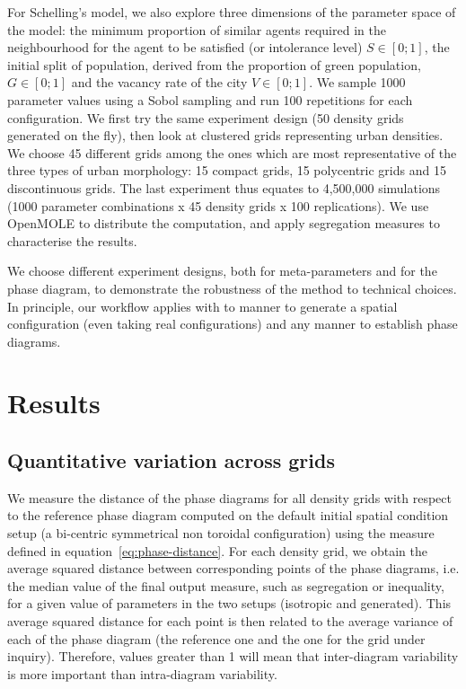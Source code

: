 \documentclass[3p,times,procedia]{elsarticle}
\begin{document}
For Schelling's model, we also explore three dimensions of the parameter space of the model: the minimum proportion of similar agents required in the neighbourhood for the agent to be satisfied (or intolerance level) $S\in \left[0;1\right]$, the initial split of population, derived from the proportion of green population, $G\in \left[0;1\right]$ and the vacancy rate of the city $V\in \left[0;1\right]$. We sample 1000 parameter values using a Sobol sampling and run 100 repetitions for each configuration. We first try the same experiment design (50 density grids generated on the fly), then look at clustered grids representing urban densities. We choose 45 different grids among the ones which are most representative of the three types of urban morphology: 15 compact grids, 15 polycentric grids and 15 discontinuous grids. The last experiment thus equates to 4,500,000 simulations (1000 parameter combinations x 45 density grids x 100 replications). We use OpenMOLE to distribute the computation, and apply segregation measures to characterise the results.



We choose different experiment designs, both for meta-parameters and for the phase diagram, to demonstrate the robustness of the method to technical choices. In principle, our workflow applies with to manner to generate a spatial configuration (even taking real configurations) and any manner to establish phase diagrams.




\section{Results}


\subsection{Quantitative variation across grids}

We measure the distance of the phase diagrams for all density grids with respect to the reference phase diagram computed on the default initial spatial condition setup (a bi-centric symmetrical non toroidal configuration) using the measure defined in equation~\ref{eq:phase-distance}. For each density grid, we obtain the average squared distance between corresponding points of the phase diagrams, i.e. the median value of the final output measure, such as segregation or inequality, for a given value of parameters in the two setups (isotropic and generated). This average squared distance for each point is then related to the average variance of each of the phase diagram (the reference one and the one for the grid under inquiry). Therefore, values greater than 1 will mean that inter-diagram variability is more important than intra-diagram variability.
\end{document}
